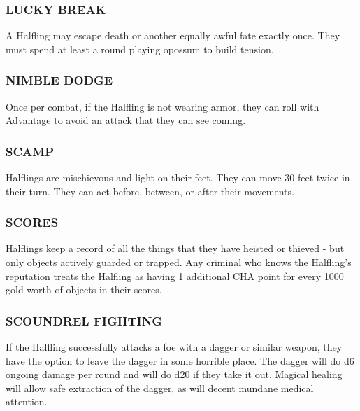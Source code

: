 \documentclass[twoside]{article}
\begin{document}
\subsubsection*{\footnotesize{L}\scriptsize{UCKY} \footnotesize{B}\scriptsize{REAK}\normalsize}

A Halfling may escape death or another equally awful fate exactly once. They must spend at least a round playing opossum to build tension.

\subsubsection*{\footnotesize{N}\scriptsize{IMBLE} \footnotesize{D}\scriptsize{ODGE}\normalsize}

Once per combat, if the Halfling is not wearing armor, they can roll with Advantage to avoid an attack that they can see coming.

\subsubsection*{\footnotesize{S}\scriptsize{CAMP}\normalsize}

Halflings are mischievous and light on their feet. They can move 30 feet twice in their turn. They can act before, between, or after their movements.

\subsubsection*{\footnotesize{S}\scriptsize{CORES}\normalsize}

Halflings keep a record of all the things that they have heisted or thieved - but only objects actively guarded or trapped. Any criminal who knows the Halfling's reputation treats the Halfling as having 1 additional CHA point for every 1000 gold worth of objects in their scores.

\subsubsection*{\footnotesize{S}\scriptsize{COUNDREL} \footnotesize{F}\scriptsize{IGHTING}\normalsize}

If the Halfling successfully attacks a foe with a dagger or similar weapon, they have the option to leave the dagger in some horrible place. The dagger will do d6 ongoing damage per round and will do d20 if they take it out. Magical healing will allow safe extraction of the dagger, as will decent mundane medical attention. 
\end{document}
